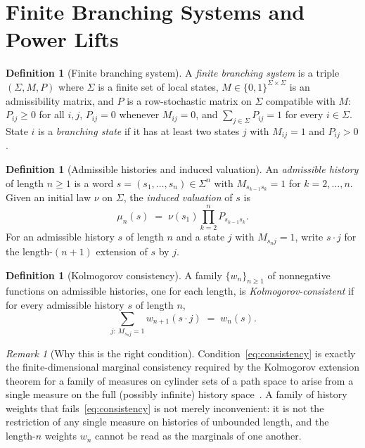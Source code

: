 \documentclass[11pt,a4paper]{article}
\theoremstyle{definition}
\newtheorem{definition}[theorem]{Definition}
\theoremstyle{remark}
\newtheorem{remark}[theorem]{Remark}
\newcommand{\Sh}{\Sigma}
\begin{document}
\section{Finite Branching Systems and Power Lifts}
\label{sec:branching}

\begin{definition}[Finite branching system]
  \label{def:system}
  A \emph{finite branching system} is a triple $(\Sh, M, P)$ where $\Sh$ is a finite set
  of local states, $M \in \{0,1\}^{\Sh \times \Sh}$ is an admissibility matrix, and $P$
  is a row-stochastic matrix on $\Sh$ compatible with $M$: $P_{ij} \ge 0$ for all
  $i,j$, $P_{ij}=0$ whenever $M_{ij}=0$, and $\sum_{j \in \Sh} P_{ij} = 1$ for every
  $i \in \Sh$. State $i$ is a \emph{branching state} if it has at least two states $j$
  with $M_{ij}=1$ and $P_{ij}>0$.
\end{definition}

\begin{definition}[Admissible histories and induced valuation]
  \label{def:history}
  An \emph{admissible history} of length $n \ge 1$ is a word
  $s=(s_1,\dots,s_n) \in \Sh^n$ with $M_{s_{k-1}s_k}=1$ for $k=2,\dots,n$. Given an
  initial law $\nu$ on $\Sh$, the \emph{induced valuation} of $s$ is
  \begin{equation}
    \label{eq:mu}
    \mu_n(s) \;=\; \nu(s_1) \prod_{k=2}^{n} P_{s_{k-1} s_k}.
  \end{equation}
  For an admissible history $s$ of length $n$ and a state $j$ with $M_{s_n j}=1$, write
  $s \cdot j$ for the length-$(n+1)$ extension of $s$ by $j$.
\end{definition}

\begin{definition}[Kolmogorov consistency]
  \label{def:consistency}
  A family $\{w_n\}_{n \ge 1}$ of nonnegative functions on admissible histories, one for
  each length, is \emph{Kolmogorov-consistent} if for every admissible history $s$ of
  length $n$,
  \begin{equation}
    \label{eq:consistency}
    \sum_{j:\, M_{s_n j}=1} w_{n+1}(s \cdot j) \;=\; w_n(s).
  \end{equation}
\end{definition}

\begin{remark}[Why this is the right condition]
  \label{rem:why-kolmogorov}
  Condition~\eqref{eq:consistency} is exactly the finite-dimensional marginal
  consistency required by the Kolmogorov extension theorem for a family of measures on
  cylinder sets of a path space to arise from a single measure on the full (possibly
  infinite) history space~\cite{Billingsley1995}. A family of history weights that
  fails~\eqref{eq:consistency} is not merely inconvenient: it is not the restriction of
  any single measure on histories of unbounded length, and the length-$n$ weights
  $w_n$ cannot be read as the marginals of one another.
\end{remark}
\end{document}
